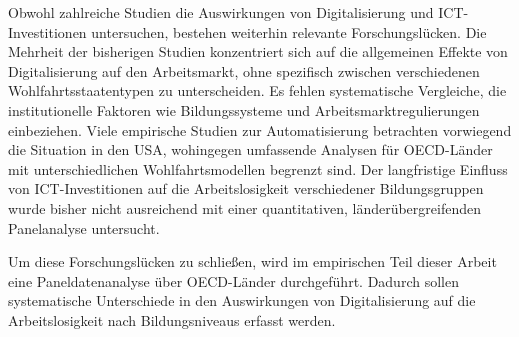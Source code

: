 Obwohl zahlreiche Studien die Auswirkungen von Digitalisierung und \ac{ICT}-Investitionen 
untersuchen, bestehen weiterhin relevante Forschungslücken. Die Mehrheit der bisherigen Studien 
konzentriert sich auf die allgemeinen Effekte von Digitalisierung auf den Arbeitsmarkt, ohne 
spezifisch zwischen verschiedenen Wohlfahrtsstaatentypen zu unterscheiden. Es fehlen 
systematische Vergleiche, die institutionelle Faktoren wie Bildungssysteme und 
Arbeitsmarktregulierungen einbeziehen. Viele empirische Studien zur Automatisierung betrachten 
vorwiegend die Situation in den USA, wohingegen umfassende Analysen für \ac{OECD}-Länder mit 
unterschiedlichen Wohlfahrtsmodellen begrenzt sind. Der langfristige Einfluss von 
\ac{ICT}-Investitionen auf die Arbeitslosigkeit verschiedener Bildungsgruppen wurde bisher nicht 
ausreichend mit einer quantitativen, länderübergreifenden Panelanalyse untersucht.

Um diese Forschungslücken zu schließen, wird im empirischen Teil dieser Arbeit eine 
Paneldatenanalyse über \ac{OECD}-Länder durchgeführt. Dadurch sollen systematische Unterschiede 
in den Auswirkungen von Digitalisierung auf die Arbeitslosigkeit nach Bildungsniveaus erfasst 
werden.

